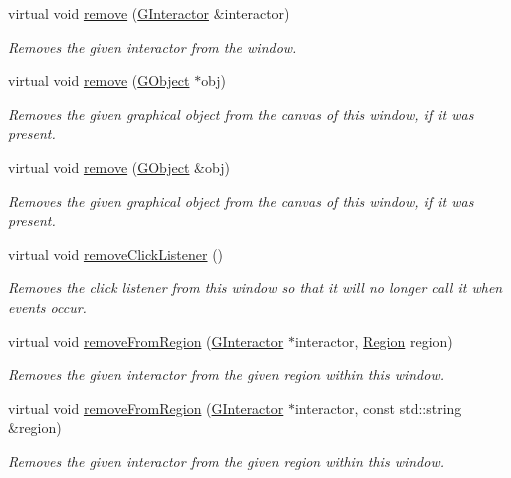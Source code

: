 \begin{DoxyCompactItemize}
virtual void \mbox{\hyperlink{classGWindow_ade2376c458ac401a0bd2dbe44271509e}{remove}} (\mbox{\hyperlink{classGInteractor}{G\+Interactor}} \&interactor)
\begin{DoxyCompactList}\small\item\em Removes the given interactor from the window. \end{DoxyCompactList}\item 
virtual void \mbox{\hyperlink{classGWindow_afc8bff4a24e05c696cbe4cba7403e558}{remove}} (\mbox{\hyperlink{classGObject}{G\+Object}} $\ast$obj)
\begin{DoxyCompactList}\small\item\em Removes the given graphical object from the canvas of this window, if it was present. \end{DoxyCompactList}\item 
virtual void \mbox{\hyperlink{classGWindow_a37cf4a26853ac22c5e3a21335dfc7ac9}{remove}} (\mbox{\hyperlink{classGObject}{G\+Object}} \&obj)
\begin{DoxyCompactList}\small\item\em Removes the given graphical object from the canvas of this window, if it was present. \end{DoxyCompactList}\item 
virtual void \mbox{\hyperlink{classGWindow_ad39d0325cde6b97ebda4b9d7787c633b}{remove\+Click\+Listener}} ()
\begin{DoxyCompactList}\small\item\em Removes the click listener from this window so that it will no longer call it when events occur. \end{DoxyCompactList}\item 
virtual void \mbox{\hyperlink{classGWindow_a87a74b040025878283ba685e30d5104f}{remove\+From\+Region}} (\mbox{\hyperlink{classGInteractor}{G\+Interactor}} $\ast$interactor, \mbox{\hyperlink{classGWindow_a81a01a86de31071a92e6cce0bab9bc4b}{Region}} region)
\begin{DoxyCompactList}\small\item\em Removes the given interactor from the given region within this window. \end{DoxyCompactList}\item 
virtual void \mbox{\hyperlink{classGWindow_a16268c8344a5a5d9b10bde95764112d1}{remove\+From\+Region}} (\mbox{\hyperlink{classGInteractor}{G\+Interactor}} $\ast$interactor, const std\+::string \&region)
\begin{DoxyCompactList}\small\item\em Removes the given interactor from the given region within this window. \end{DoxyCompactList}\item 

\end{DoxyCompactItemize}
